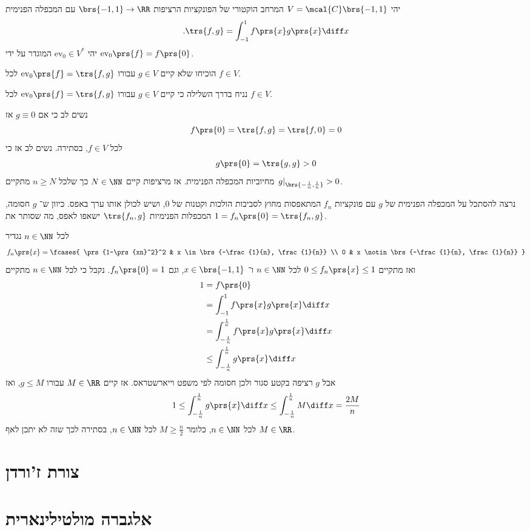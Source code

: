 \documentclass[a4paper,10pt,twoside,openany]{book}
\begin{document}
\begin{exercisechap}
יהי
$V = \mcal{C}\brs{-1, 1}$
המרחב הוקטורי של הפונקציות הרציפות
$\brs{-1, 1} \to \RR$
עם המכפלה הפנימית
\begin{align*}
\text{.} \trs{f,g} = \int_{-1}^1 f\prs{x} g\prs{x} \diff x
\end{align*}
יהי
$\mathrm{ev}_0 \in V^*$
המוגדר על ידי
$\mathrm{ev}_0\prs{f} = f\prs{0}$.

הוכיחו שלא קיים
$g \in V$
עבורו
$\mathrm{ev}_0\prs{f} = \trs{f,g}$
לכל
$f \in V$.
\end{exercisechap}

\begin{solution}
נניח בדרך השלילה כי קיים
$g \in V$
עבורו
$\mathrm{ev}_0\prs{f} = \trs{f,g}$
לכל
$f \in V$.

נשים לב כי אם
$g \equiv 0$
אז
\[f\prs{0} = \trs{f,g} = \trs{f,0} = 0\]
לכל
$f \in V$,
בסתירה.
נשים לב אז כי
\begin{align*}
g\prs{0} = \trs{g,g} > 0
\end{align*}
מחיוביות המכפלה הפנימית.
אז מרציפות קיים
$N \in \NN$
כך שלכל
$n \geq N$
מתקיים
$\left. g \right|_{\brs{-\frac{1}{n}, \frac{1}{n}}} > 0$.

נרצה להסתכל על המכפלה הפנימית של
$g$
עם פונקציות
$f_n$
המתאפסות מחוץ לסביבות הולכות וקטנות של
$0$,
ושיש לכולן אותו ערך באפס. כיוון ש־%
$g$
חסומה, המכפלות הפנימיות
$\trs{f_n, g}$
ישאפו לאפס, מה שסותר את
$1 = f_n\prs{0} = \trs{f_n, g}$.

לכל
$n \in \NN$
נגדיר
\begin{align*}
f_n\prs{x} = \fcases{
\prs{1-\prs{xn}^2}^2 & x \in \brs{-\frac{1}{n}, \frac{1}{n}} \\
0 & x \notin \brs{-\frac{1}{n}, \frac{1}{n}}
}
\end{align*}
ואז מתקיים
$0 \leq f_n\prs{x} \leq 1$
לכל
$n \in \NN$
ו־%
$x \in \brs{-1,1}$,
וגם
$f_n\prs{0} = 1$.
נקבל כי לכל
$n \in \NN$
מתקיים
\begin{align*}
1 &= f\prs{0}
\\&= \int_{-1}^1 f\prs{x} g\prs{x} \diff x
\\&= \int_{-\frac{1}{n}}^{\frac{1}{n}} f\prs{x} g\prs{x} \diff x 
\\&\leq \int_{-\frac{1}{n}}^{\frac{1}{n}} g\prs{x} \diff x
\end{align*}
אבל
$g$
רציפה בקטע סגור ולכן חסומה לפי משפט וייארשטראס. אז קיים
$M \in \RR$
עבורו
$g \leq M$,
ואז
\begin{align*}
1 \leq \int_{-\frac{1}{n}}^{\frac{1}{n}} g\prs{x} \diff x \leq \int_{-\frac{1}{n}}^{\frac{1}{n}} M \diff x = \frac{2 M}{n}
\end{align*}
לכל
$n \in \NN$,
כלומר
$M \geq \frac{n}{2}$
לכל
$n \in \NN$,
בסתירה לכך שזה לא יתכן לאף
$M \in \RR$.
\end{solution}

\part{צורת ז'ורדן}

\part{אלגברה מולטילינארית}

\printbibliography
\end{document}
